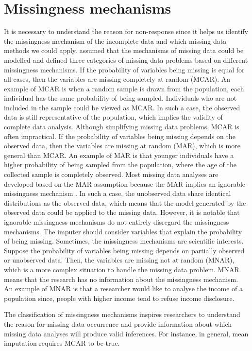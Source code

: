 \section{Missingness mechanisms}
It is necessary to understand the reason for non-response since it helps us identify the missingness mechanism of the incomplete data and which missing data methods we could apply. \citet{rubin1976inference} assumed that the mechanisms of missing data could be modelled and defined three categories of missing data problems based on different missingness mechanisms. If the probability of variables being missing is equal for all cases, then the variables are missing completely at random (MCAR). An example of MCAR is when a random sample is drawn from the population, each individual has the same probability of being sampled. Individuals who are not included in the sample could be viewed as MCAR. In such a case, the observed data is still representative of the population, which implies the validity of complete data analysis. Although simplifying missing data problems, MCAR is often impractical. If the probability of variables being missing depends on the observed data, then the variables are missing at random (MAR), which is more general than MCAR. An example of MAR is that younger individuals have a higher probability of being sampled from the population, where the age of the collected sample is completely observed. Most missing data analyses are developed based on the MAR assumption because the MAR implies an ignorable missingness mechanism \citep{little2019statistical}. In such a case, the unobserved data share identical distributions as the observed data, which means that the model generated by the observed data could be applied to the missing data. However, it is notable that ignorable missingness mechanisms do not entirely disregard the missingness mechanisms. The imputer should consider variables that explain the probability of being missing. Sometimes, the missingness mechanisms are scientific interests. Suppose the probability of variables being missing depends on partially observed or unobserved data. Then, the variables are missing not at random (MNAR), which is a more complex situation to handle the missing data problem. MNAR means that the research has no information about the missingness mechanism. An example of MNAR is that a researcher would like to analyse the income of a population since, people with higher income tend to refuse income disclosure.  

The classification of missingness mechanisms inspires researchers to understand the reason for missing data occurrence and provide information about which missing data analyses will produce valid inferences. For instance, in general, mean imputation requires MCAR to be true.  

